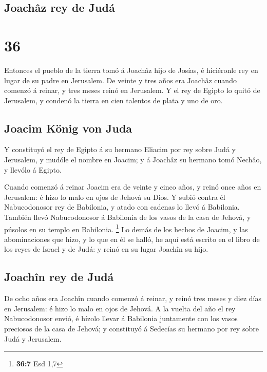 \hypertarget{joachuxe2z-rey-de-juduxe1}{%
\subsection{Joachâz rey de Judá}\label{joachuxe2z-rey-de-juduxe1}}

\hypertarget{section-35}{%
\section{36}\label{section-35}}

 Entonces el pueblo de la tierra tomó á Joachâz hijo de
Josías, é hiciéronle rey en lugar de su padre en Jerusalem.
 De veinte y tres años era Joachâz cuando comenzó á
reinar, y tres meses reinó en Jerusalem.  Y el rey de
Egipto lo quitó de Jerusalem, y condenó la tierra en cien talentos de
plata y uno de oro.

\hypertarget{joacim-kuxf6nig-von-juda}{%
\subsection{Joacim König von Juda}\label{joacim-kuxf6nig-von-juda}}

 Y constituyó el rey de Egipto á su hermano Eliacim por
rey sobre Judá y Jerusalem, y mudóle el nombre en Joacim; y á Joachâz su
hermano tomó Nechâo, y llevólo á Egipto.

 Cuando comenzó á reinar Joacim era de veinte y cinco
años, y reinó once años en Jerusalem: é hizo lo malo en ojos de Jehová
su Dios.  Y subió contra él Nabucodonosor rey de
Babilonia, y atado con cadenas lo llevó á Babilonia. 
También llevó Nabucodonosor á Babilonia de los vasos de la casa de
Jehová, y púsolos en su templo en Babilonia. \footnote{\textbf{36:7} Esd
  1,7}  Lo demás de los hechos de Joacim, y las
abominaciones que hizo, y lo que en él se halló, he aquí está escrito en
el libro de los reyes de Israel y de Judá: y reinó en su lugar Joachîn
su hijo.

\hypertarget{joachuxeen-rey-de-juduxe1}{%
\subsection{Joachîn rey de Judá}\label{joachuxeen-rey-de-juduxe1}}

 De ocho años era Joachîn cuando comenzó á reinar, y reinó
tres meses y diez días en Jerusalem: é hizo lo malo en ojos de Jehová.
 A la vuelta del año el rey Nabucodonosor envió, é hízolo
llevar á Babilonia juntamente con los vasos preciosos de la casa de
Jehová; y constituyó á Sedecías su hermano por rey sobre Judá y
Jerusalem.

